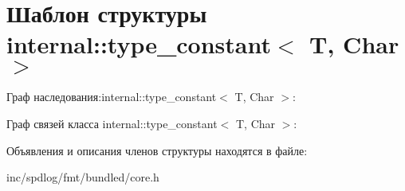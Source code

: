 \hypertarget{structinternal_1_1type__constant}{}\section{Шаблон структуры internal\+:\+:type\+\_\+constant$<$ T, Char $>$}
\label{structinternal_1_1type__constant}


Граф наследования\+:internal\+:\+:type\+\_\+constant$<$ T, Char $>$\+:


Граф связей класса internal\+:\+:type\+\_\+constant$<$ T, Char $>$\+:


Объявления и описания членов структуры находятся в файле\+:\begin{DoxyCompactItemize}
\item 
inc/spdlog/fmt/bundled/core.\+h\end{DoxyCompactItemize}
